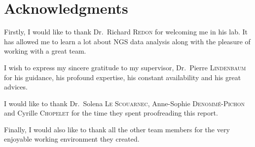 \chapter*{Acknowledgments}

Firstly, I would like to thank Dr.~Richard \textsc{Redon} for welcoming me in his lab. It has allowed me to learn a lot about NGS data analysis along with the pleasure of working with a great team.

I wish to express my sincere gratitude to my supervisor, Dr.~Pierre \textsc{Lindenbaum} for his guidance, his profound expertise, his constant availability and his great advices.

I would like to thank Dr.~Solena \textsc{Le Scouarnec}, Anne-Sophie \textsc{Denommé-Pichon} and Cyrille \textsc{Chopelet} for the time they spent proofreading this report.

Finally, I would also like to thank all the other team members for the very enjoyable working environment they created.
